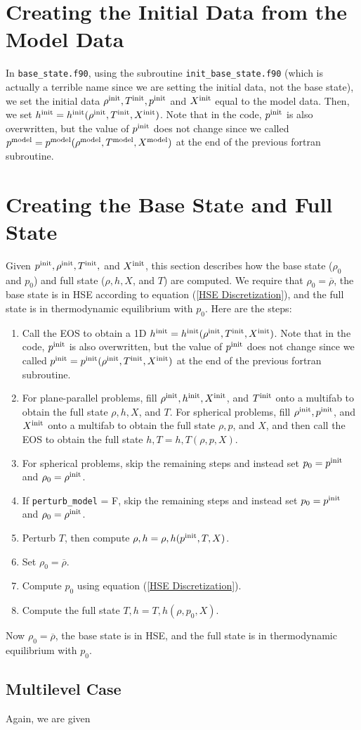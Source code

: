\documentclass[11pt]{article}
\def\init  {\rm init}
\def\model {\rm model}
\begin{document}
\section{Creating the Initial Data from the Model Data}
In {\tt base\_state.f90}, using the subroutine {\tt init\_base\_state.f90} (which is actually a terrible name since we are setting the initial data, not the base state), we set the initial data $\rho^{\init}, T^{\init}, p^{\init}$ and $X^{\init}$ equal to the model data.  Then, we set $h^{\init} = h^{\init}(\rho^{\init},T^{\init},X^{\init})$.  Note that in the code, $p^{\init}$ is also overwritten, but the value of $p^{\init}$ does not change since we called $p^{\model} = p^{\model}(\rho^{\model},T^{\model},X^{\model})$ at the end of the previous fortran subroutine.
\section{Creating the Base State and Full State}
Given $p^{\init}, \rho^{\init}, T^{\init},$ and $X^{\init}$, this section describes how the base state ($\rho_0$ and $p_0$) and full state ($\rho, h, X$, and $T$) are computed.  We require that $\rho_0 = \overline\rho$, the base state is in HSE according to equation (\ref{HSE Discretization}), and the full state is in thermodynamic equilibrium with $p_0$.  Here are the steps:
\begin{enumerate}
\item Call the EOS to obtain a 1D $h^{\init} = h^{\init}(\rho^{\init},T^{\init},X^{\init})$.  Note that in the code, $p^{\init}$ is also overwritten, but the value of $p^{\init}$ does not change since we called $p^{\init} = p^{\init}(\rho^{\init},T^{\init},X^{\init})$ at the end of the previous fortran subroutine.
\item For plane-parallel problems, fill $\rho^{\init}, h^{\init}, X^{\init}$, and $T^{\init}$ onto a multifab to obtain the full state $\rho, h, X$, and $T$.  For spherical problems, fill $\rho^{\init}, p^{\init}$, and $X^{\init}$ onto a multifab to obtain the full state $\rho, p$, and $X$, and then call the EOS to obtain the full state $h,T = h,T(\rho,p,X)$.
\item For spherical problems, skip the remaining steps and instead set $p_0 = p^{\init}$ and $\rho_0 = \rho^{\init}$.
\item If {\tt perturb\_model} = F, skip the remaining steps and instead set $p_0 = p^{\init}$ and $\rho_0 = \rho^{\init}$.
\item Perturb $T$, then compute $\rho,h = \rho,h(p^{\init},T,X)$.
\item Set $\rho_0 = \overline\rho$.
\item Compute $p_0$ using equation (\ref{HSE Discretization}).
\item Compute the full state $T,h = T,h(\rho,p_0,X)$.
\end{enumerate}
Now $\rho_0 = \overline\rho$, the base state is in HSE, and the full state is in thermodynamic equilibrium with $p_0$.
\subsection{Multilevel Case}
Again, we are given 
\end{document}
